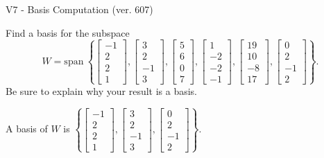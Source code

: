 \begin{exercise}
  \begin{exerciseTitle}V7 - Basis Computation (ver. 607)\end{exerciseTitle}
  \begin{exerciseStatement}
    Find a basis for the subspace 
\[W=\mathrm{span}\ \left\{\left[\begin{array}{r}
-1 \\
2 \\
2 \\
1
\end{array}\right] , \left[\begin{array}{r}
3 \\
2 \\
-1 \\
3
\end{array}\right] , \left[\begin{array}{r}
5 \\
6 \\
0 \\
7
\end{array}\right] , \left[\begin{array}{r}
1 \\
-2 \\
-2 \\
-1
\end{array}\right] , \left[\begin{array}{r}
19 \\
10 \\
-8 \\
17
\end{array}\right] , \left[\begin{array}{r}
0 \\
2 \\
-1 \\
2
\end{array}\right]\right\}.\]
 Be sure to explain why your result is a basis.


  \end{exerciseStatement}
  \begin{exerciseAnswer}
   A basis of \(W\) is  \(\left\{\left[\begin{array}{r}
-1 \\
2 \\
2 \\
1
\end{array}\right] , \left[\begin{array}{r}
3 \\
2 \\
-1 \\
3
\end{array}\right] , \left[\begin{array}{r}
0 \\
2 \\
-1 \\
2
\end{array}\right]\right\}\).
  


  \end{exerciseAnswer}
\end{exercise}